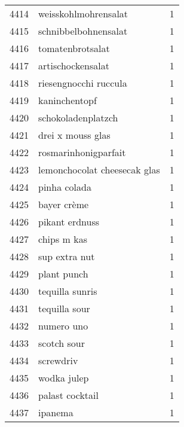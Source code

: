 \begin{tabular}{llr}
4414 &                               weisskohlmohrensalat &      1 \\
4415 &                               schnibbelbohnensalat &      1 \\
4416 &                                   tomatenbrotsalat &      1 \\
4417 &                                  artischockensalat &      1 \\
4418 &                              riesengnocchi ruccula &      1 \\
4419 &                                      kaninchentopf &      1 \\
4420 &                                 schokoladenplatzch &      1 \\
4421 &                                  drei x mouss glas &      1 \\
4422 &                               rosmarinhonigparfait &      1 \\
4423 &                       lemonchocolat cheesecak glas &      1 \\
4424 &                                       pinha colada &      1 \\
4425 &                                        bayer crème &      1 \\
4426 &                                     pikant erdnuss &      1 \\
4427 &                                        chips m kas &      1 \\
4428 &                                      sup extra nut &      1 \\
4429 &                                        plant punch &      1 \\
4430 &                                    tequilla sunris &      1 \\
4431 &                                      tequilla sour &      1 \\
4432 &                                         numero uno &      1 \\
4433 &                                        scotch sour &      1 \\
4434 &                                          screwdriv &      1 \\
4435 &                                        wodka julep &      1 \\
4436 &                                    palast cocktail &      1 \\
4437 &                                            ipanema &      1 \\

\end{tabular}
